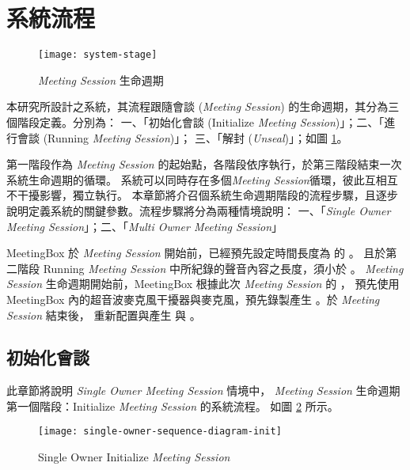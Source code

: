 \section{系統流程}

\begin{figure}[H]
    \centering
    \texttt{[image: system-stage]}
    \caption{{\it Meeting Session} 生命週期}
    \label{fig:system-stage}
\end{figure}

    本研究所設計之系統，其流程跟隨會談 ({\it Meeting Session}) 的生命週期，其分為三個階段定義。分別為：
一、「初始化會談 (Initialize {\it Meeting Session})」；二、「進行會談 (Running {\it Meeting Session})」；
三、「解封 ({\it Unseal})」；如圖 \ref{fig:system-stage}。

    第一階段作為 {\it Meeting Session} 的起始點，各階段依序執行，於第三階段結束一次系統生命週期的循環。
系統可以同時存在多個{\it Meeting Session}循環，彼此互相互不干擾影響，獨立執行。
本章節將介召個系統生命週期階段的流程步驟，且逐步說明定義系統的關鍵參數。流程步驟將分為兩種情境說明：
一、「{\it Single Owner Meeting Session}」；二、「{\it Multi Owner Meeting Session}」

    MeetingBox 於 {\it Meeting Session} 開始前，已經預先設定時間長度為 \DEFtimeMAX 的 \DEFrecN。
且於第二階段 Running {\it Meeting Session} 中所紀錄的聲音內容之長度，須小於  \DEFtimeMAX。
{\it Meeting Session} 生命週期開始前，MeetingBox 根據此次 {\it Meeting Session} 的 \DEFseed，
預先使用 MeetingBox 內的超音波麥克風干擾器與麥克風，預先錄製產生 \DEFrecN。於 {\it Meeting Session} 結束後，
重新配置與產生 \DEFseed 與 \DEFrecN。


\subsection{初始化會談}
\label{subsec.initialize}

    此章節將說明 {\it Single Owner Meeting Session} 情境中，
{\it Meeting Session} 生命週期第一個階段：Initialize {\it Meeting Session} 的系統流程。
如圖 \ref{fig:s-o-init} 所示。

\begin{figure}[H]
    \centering
    \texttt{[image: single-owner-sequence-diagram-init]}
    \caption{Single Owner Initialize {\it Meeting Session}}
    \label{fig:s-o-init}
\end{figure}

